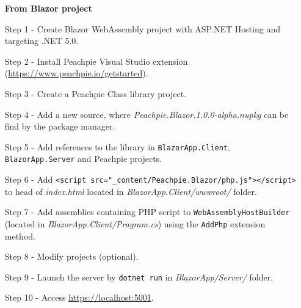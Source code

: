 \par
\begin{itemize}
\item [\textbf{From Blazor project}]
\item [Step 1 -] Create Blazor WebAssembly project with ASP.NET Hosting and targeting .NET 5.0.
\item [Step 2 -]  Install Peachpie Visual Studio extension (\url{https://www.peachpie.io/getstarted}).
\item [Step 3 -] Create a Peachpie Class library project.
\item [Step 4 -] Add a new source, where \textit{Peachpie.Blazor.1.0.0-alpha.nupkg} can be find by the package manager.
\item [Step 5 -] Add references to the library in \texttt{BlazorApp.Client}, \texttt{BlazorApp.Server} and Peachpie projects.
\item [Step 6 -] Add \texttt{<script src="\_content/Peachpie.Blazor/php.js"></script>} to head of \textit{index.html} located in \textit{BlazorApp.Client/wwwroot/} folder.
\item [Step 7 -] Add assemblies containing PHP script to \texttt{WebAssemblyHostBuilder} (located in \textit{BlazorApp.Client/Pragram.cs}) using the \texttt{AddPhp} extension method.
\item [Step 8 -] Modify projects (optional).
\item [Step 9 -] Launch the server by \texttt{dotnet run} in \textit{BlazorApp/Server/} folder. 
\item [Step 10 -]  Access \url{https://localhost:5001}.
\end{itemize}
